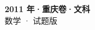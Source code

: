 \documentclass[zihao=-4, a4paper]{ctexart}
\begin{document}
\begin{center}
  {\Large\bfseries 2011 年·重庆卷·文科}\\[4pt]
  {\large 数学 · 试题版}
\end{center}
\medskip
{}

\end{document}
